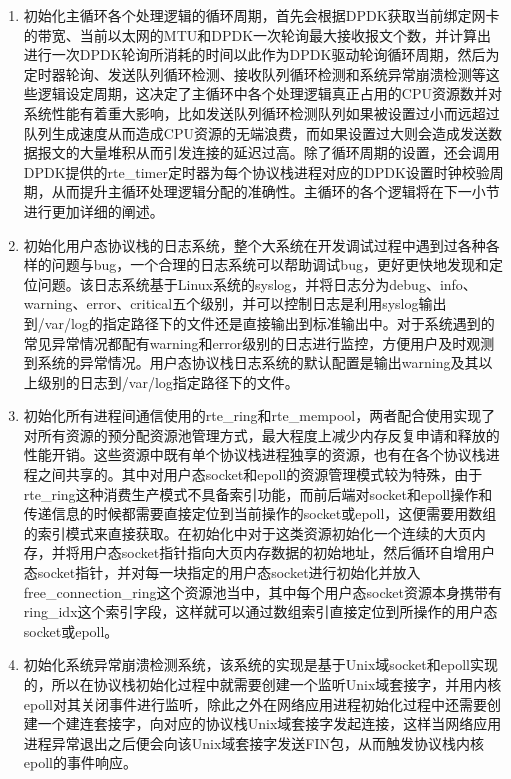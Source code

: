 \begin{enumerate}[(1),labelsep=.5em, leftmargin = 0pt, itemindent = 3em]
\item 初始化主循环各个处理逻辑的循环周期，首先会根据DPDK获取当前绑定网卡的带宽、当前以太网的MTU和DPDK一次轮询最大接收报文个数，并计算出进行一次DPDK轮询所消耗的时间以此作为DPDK驱动轮询循环周期，然后为定时器轮询、发送队列循环检测、接收队列循环检测和系统异常崩溃检测等这些逻辑设定周期，这决定了主循环中各个处理逻辑真正占用的CPU资源数并对系统性能有着重大影响，比如发送队列循环检测队列如果被设置过小而远超过队列生成速度从而造成CPU资源的无端浪费，而如果设置过大则会造成发送数据报文的大量堆积从而引发连接的延迟过高。除了循环周期的设置，还会调用DPDK提供的rte\_timer定时器为每个协议栈进程对应的DPDK设置时钟校验周期，从而提升主循环处理逻辑分配的准确性。主循环的各个逻辑将在下一小节进行更加详细的阐述。
\item 初始化用户态协议栈的日志系统，整个大系统在开发调试过程中遇到过各种各样的问题与bug，一个合理的日志系统可以帮助调试bug，更好更快地发现和定位问题。该日志系统基于Linux系统的syslog，并将日志分为debug、info、warning、error、critical五个级别，并可以控制日志是利用syslog输出到/var/log的指定路径下的文件还是直接输出到标准输出中。对于系统遇到的常见异常情况都配有warning和error级别的日志进行监控，方便用户及时观测到系统的异常情况。用户态协议栈日志系统的默认配置是输出warning及其以上级别的日志到/var/log指定路径下的文件。
\item 初始化所有进程间通信使用的rte\_ring和rte\_mempool，两者配合使用实现了对所有资源的预分配资源池管理方式，最大程度上减少内存反复申请和释放的性能开销。这些资源中既有单个协议栈进程独享的资源，也有在各个协议栈进程之间共享的。其中对用户态socket和epoll的资源管理模式较为特殊，由于rte\_ring这种消费生产模式不具备索引功能，而前后端对socket和epoll操作和传递信息的时候都需要直接定位到当前操作的socket或epoll，这便需要用数组的索引模式来直接获取。在初始化中对于这类资源初始化一个连续的大页内存，并将用户态socket指针指向大页内存数据的初始地址，然后循环自增用户态socket指针，并对每一块指定的用户态socket进行初始化并放入free\_connection\_ring这个资源池当中，其中每个用户态socket资源本身携带有ring\_idx这个索引字段，这样就可以通过数组索引直接定位到所操作的用户态socket或epoll。
\item 初始化系统异常崩溃检测系统，该系统的实现是基于Unix域socket和epoll实现的，所以在协议栈初始化过程中就需要创建一个监听Unix域套接字，并用内核epoll对其关闭事件进行监听，除此之外在网络应用进程初始化过程中还需要创建一个建连套接字，向对应的协议栈Unix域套接字发起连接，这样当网络应用进程异常退出之后便会向该Unix域套接字发送FIN包，从而触发协议栈内核epoll的事件响应。
\end{enumerate}

